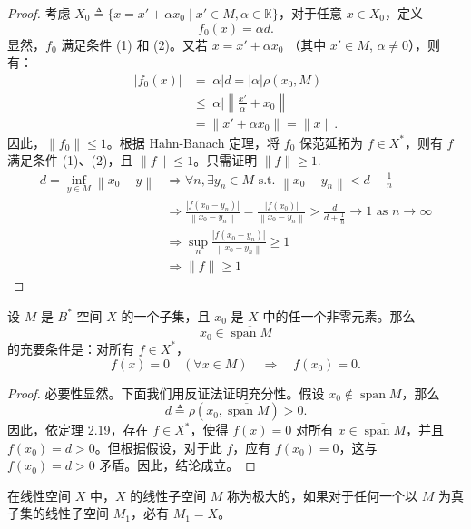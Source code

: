 \documentclass[lang=cn,newtx,10pt,scheme=chinese,thmcnt=chapter]{elegantbook}
\begin{document}
\begin{proof}
    考虑 \( X_0 \triangleq \{ x = x' + \alpha x_0 \mid x' \in M, \alpha \in \mathbb{K} \} \)，对于任意 \( x \in X_0 \)，定义
    \[
    f_0(x) = \alpha d.
    \]
    显然，\( f_0 \) 满足条件 (1) 和 (2)。又若 \( x = x' + \alpha x_0 \) （其中 \( x' \in M \), \( \alpha \neq 0 \)），则有：
    \[
    \begin{aligned}
    |f_0(x)| &= |\alpha| d = |\alpha| \rho(x_0, M) \\
    &\leqslant |\alpha| \left\|\frac{x'}{\alpha} + x_0 \right\| \\
    &= \|x' + \alpha x_0\| = \|x\|.
    \end{aligned}
    \]
    因此，\( \|f_0\| \leqslant 1 \)。根据 Hahn-Banach 定理，将 \( f_0 \) 保范延拓为 \( f \in X^* \)，则有 \( f \) 满足条件 (1)、(2)，且 \( \|f\| \leqslant 1 \)。只需证明 $\|f\| \geqslant 1$.
\begin{equation*}
\begin{aligned}
d=\inf _{y \in M}\left\|x_0-y\right\| & \Rightarrow \forall n, \exists y_n \in M \text { s.t. }\left\|x_0-y_n\right\|<d+\frac{1}{n} \\
& \Rightarrow \frac{\left|f\left(x_0-y_n\right)\right|}{\left\|x_0-y_n\right\|}=\frac{\left|f\left(x_0\right)\right|}{\left\|x_0-y_n\right\|}>\frac{d}{d+\frac{1}{n}} \rightarrow 1 \text { as } n \rightarrow \infty \\
& \Rightarrow \sup _n \frac{\left|f\left(x_0-y_n\right)\right|}{\left\|x_0-y_n\right\|} \geqslant 1 \\
& \Rightarrow\|f\| \geqslant 1
\end{aligned}
\end{equation*}
\end{proof}

\begin{corollary}
    设 \( M \) 是 \( B^* \) 空间 \( X \) 的一个子集，且 \( x_0 \) 是 \( X \) 中的任一个非零元素。那么
    \[
    x_0 \in \overline{\operatorname{span} M}
    \]
    的充要条件是：对所有 \( f \in X^* \)，
    \[
    f(x) = 0 \quad (\forall x \in M) \quad \Longrightarrow \quad f(x_0) = 0.
    \]
\end{corollary}

\begin{proof}
    必要性显然。下面我们用反证法证明充分性。假设 \( x_0 \notin \overline{\operatorname{span} M} \)，那么
    \[
    d \triangleq \rho(x_0, \overline{\operatorname{span} M}) > 0.
    \]
    因此，依定理 2.19，存在 \( f \in X^* \)，使得 \( f(x) = 0 \) 对所有 \( x \in \overline{\operatorname{span} M} \)，并且 \( f(x_0) = d > 0 \)。但根据假设，对于此 \( f \)，应有 \( f(x_0) = 0 \)，这与 \( f(x_0) = d > 0 \) 矛盾。因此，结论成立。
\end{proof}
\begin{definition}
    在线性空间 \( X \) 中，\( X \) 的线性子空间 \( M \) 称为极大的，如果对于任何一个以 \( M \) 为真子集的线性子空间 \( M_1 \)，必有 \( M_1 = X \)。
\end{definition}
\end{document}
